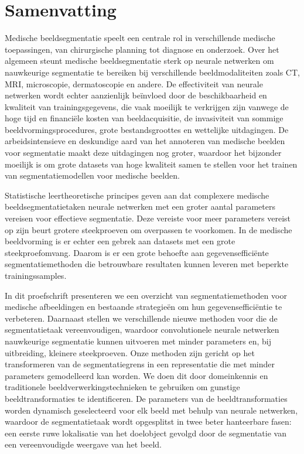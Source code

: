 \chapter{Samenvatting}

Medische beeldsegmentatie speelt een centrale rol in verschillende medische toepassingen, van chirurgische planning tot diagnose en onderzoek. Over het algemeen steunt medische beeldsegmentatie sterk op neurale netwerken om nauwkeurige segmentatie te bereiken bij verschillende beeldmodaliteiten zoals CT, MRI, microscopie, dermatoscopie en andere. De effectiviteit van neurale netwerken wordt echter aanzienlijk beïnvloed door de beschikbaarheid en kwaliteit van trainingsgegevens, die vaak moeilijk te verkrijgen zijn vanwege de hoge tijd en financiële kosten van beeldacquisitie, de invasiviteit van sommige beeldvormingsprocedures, grote bestandsgroottes en wettelijke uitdagingen. De arbeidsintensieve en deskundige aard van het annoteren van medische beelden voor segmentatie maakt deze uitdagingen nog groter, waardoor het bijzonder moeilijk is om grote datasets van hoge kwaliteit samen te stellen voor het trainen van segmentatiemodellen voor medische beelden.

Statistische leertheoretische principes geven aan dat complexere medische beeldsegmentatietaken neurale netwerken met een groter aantal parameters vereisen voor effectieve segmentatie. Deze vereiste voor meer parameters vereist op zijn beurt grotere steekproeven om overpassen te voorkomen. In de medische beeldvorming is er echter een gebrek aan datasets met een grote steekproefomvang. Daarom is er een grote behoefte aan gegevensefficiënte segmentatiemethoden die betrouwbare resultaten kunnen leveren met beperkte trainingssamples. 

In dit proefschrift presenteren we een overzicht van segmentatiemethoden voor medische afbeeldingen en bestaande strategieën om hun gegevensefficiëntie te verbeteren. Daarnaast stellen we verschillende nieuwe methoden voor die de segmentatietaak vereenvoudigen, waardoor convolutionele neurale netwerken nauwkeurige segmentatie kunnen uitvoeren met minder parameters en, bij uitbreiding, kleinere steekproeven. Onze methoden zijn gericht op het transformeren van de segmentatiegrens in een representatie die met minder parameters gemodelleerd kan worden. We doen dit door domeinkennis en traditionele beeldverwerkingstechnieken te gebruiken om gunstige beeldtransformaties te identificeren. De parameters van de beeldtransformaties worden dynamisch geselecteerd voor elk beeld met behulp van neurale netwerken, waardoor de segmentatietaak wordt opgesplitst in twee beter hanteerbare fasen: een eerste ruwe lokalisatie van het doelobject gevolgd door de segmentatie van een vereenvoudigde weergave van het beeld.

